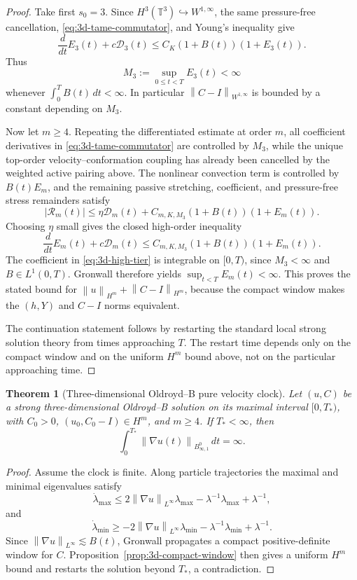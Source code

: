 \documentclass[11pt]{article}
\newtheorem{theorem}{Theorem}[section]
\newcommand{\T}{\mathbb T}
\newcommand{\calD}{\mathcal D}
\newcommand{\norm}[1]{\left\lVert #1\right\rVert}
\newcommand{\Besov}{B^0_{\infty,1}}
\begin{document}
\begin{proof}
Take first \(s_0=3\).  Since \(H^3(\T^3)\hookrightarrow W^{1,\infty}\), the same
pressure-free cancellation, \eqref{eq:3d-tame-commutator}, and Young's
inequality give
\begin{equation}
  \frac{d}{dt}E_3(t)+c\calD_3(t)
  \le
  C_K(1+B(t))(1+E_3(t)).
  \label{eq:3d-low-tier}
\end{equation}
Thus
\[
  M_3:=\sup_{0\le t<T}E_3(t)<\infty
\]
whenever \(\int_0^T B(t)\,dt<\infty\).  In particular
\(\norm{C-I}_{W^{1,\infty}}\) is bounded by a constant depending on \(M_3\).

Now let \(m\ge4\).  Repeating the differentiated estimate at order \(m\), all
coefficient derivatives in \eqref{eq:3d-tame-commutator} are controlled by
\(M_3\), while the unique top-order velocity--conformation coupling has already
been cancelled by the weighted active pairing above.  The nonlinear convection
term is controlled by \(B(t)E_m\), and the remaining passive stretching,
coefficient, and pressure-free stress remainders satisfy
\[
  |\mathcal R_m(t)|
  \le
  \eta\calD_m(t)+C_{m,K,M_3}(1+B(t))(1+E_m(t)).
\]
Choosing \(\eta\) small gives the closed high-order inequality
\begin{equation}
  \frac{d}{dt}E_m(t)+c\calD_m(t)
  \le
  C_{m,K,M_3}(1+B(t))(1+E_m(t)).
  \label{eq:3d-high-tier}
\end{equation}
The coefficient in \eqref{eq:3d-high-tier} is integrable on \([0,T)\), since
\(M_3<\infty\) and \(B\in L^1(0,T)\).  Gronwall therefore yields
\(\sup_{t<T}E_m(t)<\infty\).  This proves the stated bound for
\(\norm{u}_{H^m}+\norm{C-I}_{H^m}\), because the compact window makes the
\((h,Y)\) and \(C-I\) norms equivalent.

The continuation statement follows by restarting the standard local strong
solution theory from times approaching \(T\).  The restart time depends only on
the compact window and on the uniform \(H^m\) bound above, not on the particular
approaching time.
\end{proof}


\begin{theorem}[Three-dimensional Oldroyd--B pure velocity clock]
\label{thm:3d-ob-clock}
Let \((u,C)\) be a strong three-dimensional Oldroyd--B solution on its maximal
interval \([0,T_*)\), with \(C_0>0\), \((u_0,C_0-I)\in H^m\), and \(m\ge4\).  If
\(T_*<\infty\), then
\[
  \int_0^{T_*}\norm{\nabla u(t)}_{\Besov}\,dt=\infty .
\]
\end{theorem}

\begin{proof}
Assume the clock is finite.  Along particle trajectories the maximal and
minimal eigenvalues satisfy
\[
  \dot\lambda_{\max}\le
  2\norm{\nabla u}_{L^\infty}\lambda_{\max}
  -\lambda^{-1}\lambda_{\max}+\lambda^{-1},
\]
and
\[
  \dot\lambda_{\min}\ge
  -2\norm{\nabla u}_{L^\infty}\lambda_{\min}
  -\lambda^{-1}\lambda_{\min}+\lambda^{-1}.
\]
Since \(\norm{\nabla u}_{L^\infty}\lesssim B(t)\), Gronwall propagates a
compact positive-definite window for \(C\).  Proposition~\ref{prop:3d-compact-window}
then gives a uniform \(H^m\) bound and restarts the solution beyond \(T_*\), a
contradiction.
\end{proof}
\end{document}
